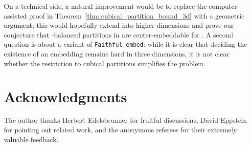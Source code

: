 \documentclass[12pt]{article}
\begin{document}
On a technical side, a natural improvement would be to replace
the computer-assisted proof in Theorem~\ref{thm:cubical_partition_bound_3d}
with a geometric argument; this would hopefully extend into higher dimensions
and prove our conjecture that -balanced partitions in 
are center-embeddable for .
A second question is about a variant of \texttt{Faithful\_embed}: 
while it is clear
that deciding the existence of an embedding remains hard in three
dimensions, it is not clear whether the restriction to cubical
partitions simplifies the problem.

\section*{Acknowledgments}
The author thanks Herbert Edelsbrunner for fruitful discussions,
David Eppstein for pointing out related work,
and the anonymous referees for their extremely valuable feedback.
\end{document}
